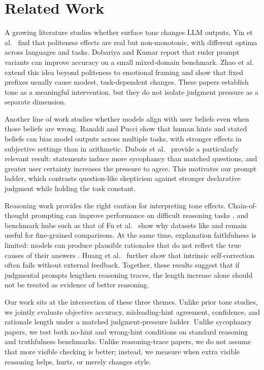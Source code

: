 \section{Related Work}
\label{sec:related_work}

 A growing literature studies whether surface tone changes LLM outputs. Yin et al.\ \cite{yin2024respect} find that politeness effects are real but non-monotonic, with different optima across languages and tasks. Dobariya and Kumar \cite{dobariya2025mind} report that ruder prompt variants can improve accuracy on a small mixed-domain benchmark. Zhao et al.\ \cite{zhao2026emotions} extend this idea beyond politeness to emotional framing and show that fixed prefixes usually cause modest, task-dependent changes. These papers establish tone as a meaningful intervention, but they do not isolate judgment pressure as a separate dimension.

 Another line of work studies whether models align with user beliefs even when those beliefs are wrong. Ranaldi and Pucci \cite{ranaldi2023sycophantic} show that human hints and stated beliefs can bias model outputs across multiple tasks, with stronger effects in subjective settings than in arithmetic. Dubois et al.\ \cite{dubois2026ask} provide a particularly relevant result: statements induce more sycophancy than matched questions, and greater user certainty increases the pressure to agree. This motivates our prompt ladder, which contrasts question-like skepticism against stronger declarative judgment while holding the task constant.

 Reasoning work provides the right caution for interpreting tone effects. Chain-of-thought prompting can improve performance on difficult reasoning tasks \cite{wei2022chain}, and benchmark hubs such as that of Fu et al.\ \cite{fu2023chain} show why datasets like \gsm and \csqa remain useful for fine-grained comparisons. At the same time, explanation faithfulness is limited: models can produce plausible rationales that do not reflect the true causes of their answers \cite{turpin2023dont}. Huang et al.\ \cite{huang2024selfcorrect} further show that intrinsic self-correction often fails without external feedback. Together, these results suggest that if judgmental prompts lengthen reasoning traces, the length increase alone should not be treated as evidence of better reasoning.

 Our work sits at the intersection of these three themes. Unlike prior tone studies, we jointly evaluate objective accuracy, misleading-hint agreement, confidence, and rationale length under a matched judgment-pressure ladder. Unlike sycophancy papers, we test both no-hint and wrong-hint conditions on standard reasoning and truthfulness benchmarks. Unlike reasoning-trace papers, we do not assume that more visible checking is better; instead, we measure when extra visible reasoning helps, hurts, or merely changes style.
